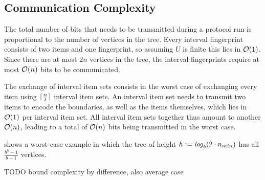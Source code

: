\subsection{Communication Complexity}
\label{communication-complexity}

The total number of bits that needs to be transmitted during a protocol run is proportional to the number of vertices in the tree. Every interval fingerprint consists of two items and one fingerprint, so assuming $U$ is finite this lies in $\mathcal{O}(1)$. Since there are at most $2n$ vertices in the tree, the interval fingerprints require at most $\mathcal{O}(n)$ bits to be communicated.

The exchange of interval item sets consists in the worst case of exchanging every item using $\lceil\frac{n}{t}\rceil$ interval item sets. An interval item set needs to transmit two items to encode the boundaries, as well as the items themselves, which lies in $\mathcal{O}(1)$ per interval item set. All interval item sets together thus amount to another $\mathcal{O}(n)$, leading to a total of $\mathcal{O}(n)$ bits being transmitted in the worst case.

 shows a worst-case example in which the tree of height $h \vcentcolon= \mathit{log}_{b}(2 \cdot n_{min})$ has all $\frac{b^{h} - 1}{b - 1}$ vertices. 

TODO bound complexity by difference, also average case

